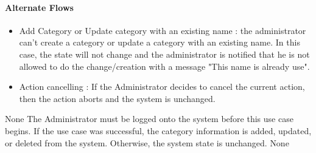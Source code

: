 {  \paragraph{Alternate Flows}
  \begin{itemize}
    \item Add Category or Update category with an existing name : the administrator can’t create a category or update a category with an existing name. In this case, the state will not change and the administrator is notified that he is not allowed to do the change/creation with a message "This name is already use".
    \item Action cancelling : If the Administrator decides to cancel the current action, then the action aborts and the system is unchanged.
  \end{itemize}
}
{
  None
}
{
  The Administrator must be logged onto the system before this use case begins.
}
{
  If the use case was successful, the category information is added, updated, or deleted from the system. Otherwise, the system state is unchanged.
}
{
  None
}

